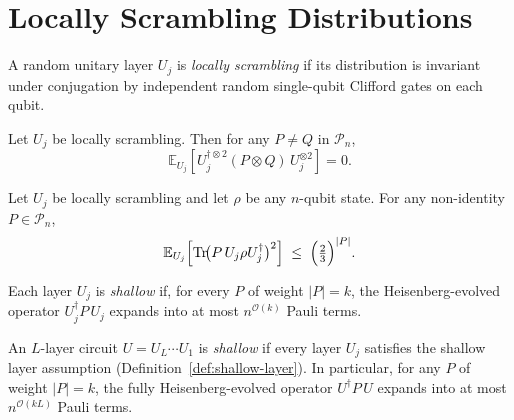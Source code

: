 \section{Locally Scrambling Distributions}

\begin{definition}
  \label{def:locally-scrambling}
  \leanok
  A random unitary layer $U_j$ is \emph{locally scrambling} if its distribution is
  invariant under conjugation by independent random single-qubit Clifford gates on
  each qubit.
\end{definition}

\begin{lemma}
  \label{lem:pauli-orthogonality}
  \leanok
  Let $U_j$ be locally scrambling. Then for any $P \neq Q$ in $\mathcal{P}_n$,
  \[
    \mathbb{E}_{U_j}\!\left[U_j^{\dagger\otimes 2}(P \otimes Q)\,U_j^{\otimes 2}\right] = 0.
  \]
\end{lemma}

\begin{lemma}
  \label{lem:pauli-mixing}
  \leanok
  Let $U_j$ be locally scrambling and let $\rho$ be any $n$-qubit state.  For any
  non-identity $P \in \mathcal{P}_n$,
  \[
    \mathbb{E}_{U_j}\!\left[\operatorname{Tr}\!\bigl(P\,U_j\rho U_j^\dagger\bigr)^2\right]
    \;\leq\;
    \Bigl(\tfrac{2}{3}\Bigr)^{|P|}.
  \]
\end{lemma}

\begin{definition}
  \label{def:shallow-layer}
  Each layer $U_j$ is \emph{shallow} if, for every $P$ of weight $|P| = k$, the
  Heisenberg-evolved operator $U_j^\dagger P\, U_j$ expands into at most
  $n^{\mathcal{O}(k)}$ Pauli terms.
\end{definition}

\begin{definition}
  \label{def:shallow-circuit}
  An $L$-layer circuit $U = U_L \cdots U_1$ is \emph{shallow} if every layer
  $U_j$ satisfies the shallow layer assumption (Definition~\ref{def:shallow-layer}).
  In particular, for any $P$ of weight $|P| = k$, the fully Heisenberg-evolved
  operator $U^\dagger P\, U$ expands into at most $n^{\mathcal{O}(kL)}$ Pauli terms.
\end{definition}

